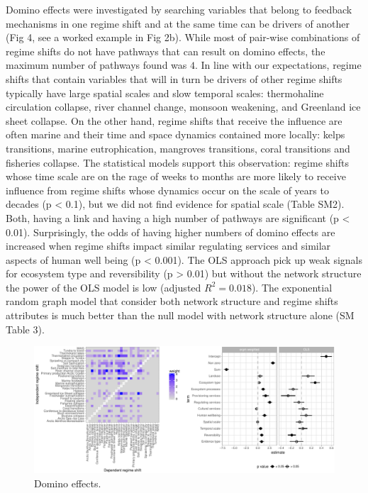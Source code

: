 \documentclass[9pt,]{article}
\begin{document}
Domino effects were investigated by searching variables that belong to
feedback mechanisms in one regime shift and at the same time can be
drivers of another (Fig 4, see a worked example in Fig 2b). While most
of pair-wise combinations of regime shifts do not have pathways that can
result on domino effects, the maximum number of pathways found was
\(4\). In line with our expectations, regime shifts that contain
variables that will in turn be drivers of other regime shifts typically
have large spatial scales and slow temporal scales: thermohaline
circulation collapse, river channel change, monsoon weakening, and
Greenland ice sheet collapse. On the other hand, regime shifts that
receive the influence are often marine and their time and space dynamics
contained more locally: kelps transitions, marine eutrophication,
mangroves transitions, coral transitions and fisheries collapse. The
statistical models support this observation: regime shifts whose time
scale are on the rage of weeks to months are more likely to receive
influence from regime shifts whose dynamics occur on the scale of years
to decades (p \textless{} 0.1), but we did not find evidence for spatial
scale (Table SM2). Both, having a link and having a high number of
pathways are significant (p \textless{} 0.01). Surprisingly, the odds of
having higher numbers of domino effects are increased when regime shifts
impact similar regulating services and similar aspects of human well
being (p \textless{} 0.001). The OLS approach pick up weak signals for
ecosystem type and reversibility (p \textgreater{} 0.01) but without the
network structure the power of the OLS model is low (adjusted
\(R^2= 0.018\)). The exponential random graph model that consider both
network structure and regime shifts attributes is much better than the
null model with network structure alone (SM Table 3).

\begin{figure}

{\centering \includegraphics{170830_draftCascadingEffects_files/figure-latex/Fig4-1} 

}

\caption{Domino effects.}\label{fig:Fig4}
\end{figure}
\end{document}
